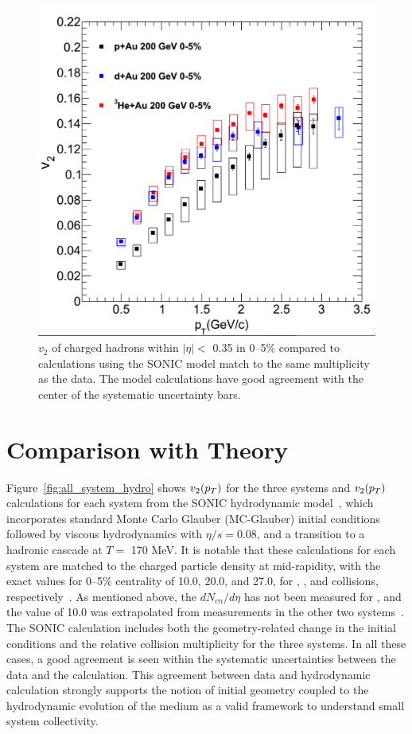 \begin{figure}[!ht]
\begin{center}
\includegraphics[width=0.65\linewidth]{figs/v2_3_sys_compare_nohydro.png}
\caption{$v_2$ of charged hadrons within $|\eta| <$ 0.35 in 0--5\% \pau compared to calculations using the SONIC model match to the same multiplicity as the data. The model calculations have good agreement with the center of the systematic uncertainty bars.}
\label{fig:v2_3_sys_compare_nohydro}
\end{center}
\end{figure}

\section{Comparison with Theory}
Figure~\ref{fig:all_system_hydro} shows $v_2(\mbox{$p_T$})$ for the three systems and $v_2(\mbox{$p_T$})$ calculations for each system from the SONIC hydrodynamic model~\cite{Habich:2014jna}, which incorporates standard Monte Carlo Glauber (MC-Glauber) initial conditions followed by viscous hydrodynamics with $\eta/s=0.08$, and a transition to a hadronic cascade at $T=$ 170 MeV. It is notable that these calculations for each system are matched to the charged particle density at mid-rapidity, with the exact values for 0--5\% centrality of 10.0, 20.0, and 27.0, for \pau, \dau, and \hau collisions, respectively~\cite{Habich:2014jna}. As mentioned above, the $dN_{cn}/d\eta$ has not been measured for \pau, and the value of 10.0 was extrapolated from measurements in the other two systems~\cite{Habich:2014jna}. The SONIC calculation includes both the geometry-related change in the initial conditions and the relative collision multiplicity for the three systems. In all these cases, a good agreement is seen within the systematic uncertainties between the data and the calculation. This agreement between data and hydrodynamic calculation strongly supports the notion of initial geometry coupled to the hydrodynamic evolution of the medium as a valid framework to understand small system collectivity.

